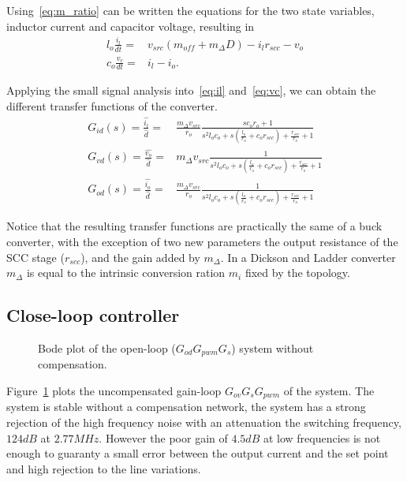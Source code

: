 Using~\eqref{eq:m_ratio} can be written the equations for the two state variables, inductor current and capacitor voltage, resulting in
\begin{align}
 l_o \frac{i_l}{dt} = &  v_{src} (m_{off} + m_{\Delta} D ) - i_l r_{scc} - v_o \label{eq:il}\\
 c_o \frac{v_c}{dt} = &  i_l - i_o.
 \label{eq:vc}
\end{align}

Applying the small signal analysis into~\eqref{eq:il} and~\eqref{eq:vc}, we can obtain the different transfer functions of the converter.
\begin{align}
 G_{id}(s) =  \frac{\widehat{i_l}}{\widehat{d}} = &
 \frac{m_{\Delta} v_{src}}{r_o} \frac{s c_o r_o + 1  }
 { s^2 l_o c_o  + s \left ( \frac{l_o}{r_o}  + c_o r_{scc}  \right )  +  \frac{r_{scc}}{r_o} + 1 } \label{eq:g_id}\\
 G_{vd}(s) =  \frac{\widehat{v_o}}{\widehat{d}} = &
 m_{\Delta} v_{src} \frac{ 1  }
 { s^2 l_o c_o  + s \left ( \frac{l_o}{r_o}  + c_o r_{scc}  \right )  +  \frac{r_{scc}}{r_o} + 1 } \label{eq:g_id}\\
 G_{od}(s) =  \frac{\widehat{i_o}}{\widehat{d}} = &
 \frac{ m_{\Delta}v_{src}}{r_o} \frac{1  }
 { s^2 l_o c_o  + s \left ( \frac{l_o}{r_o}  + c_o r_{scc}  \right )  +  \frac{r_{scc}}{r_o} + 1 } \label{eq:g_od}
\end{align}

Notice that the resulting transfer functions are practically the same of a buck converter, with the exception of two new parameters the output resistance of the SCC stage ($r_{scc}$), and the gain added by $m_\Delta$. In a Dickson and Ladder converter $m_\Delta$ is equal to the intrinsic conversion ration $m_i$ fixed by the topology.

\subsection{Close-loop controller}
\begin{figure}[!h]
    \newcommand\pHeigh{3cm}
    \newcommand\pWidth{8cm}
    \centering
    
    \caption[]{Bode plot of the open-loop ($G_{od}G_{pwm}G_s$) system without compensation.}
    \label{fig:ol_bode}
\end{figure}
Figure~\ref{fig:ol_bode} plots the uncompensated gain-loop $G_{ov}G_s G_{pwm}$ of the system. The system is stable without a compensation network, the system has a strong rejection of the high frequency noise with an attenuation the switching frequency, $124dB$ at $2.77MHz$. However the poor gain of $4.5dB$ at low frequencies is not enough to guaranty a small error between the output current and the set point and high rejection to the line variations.

